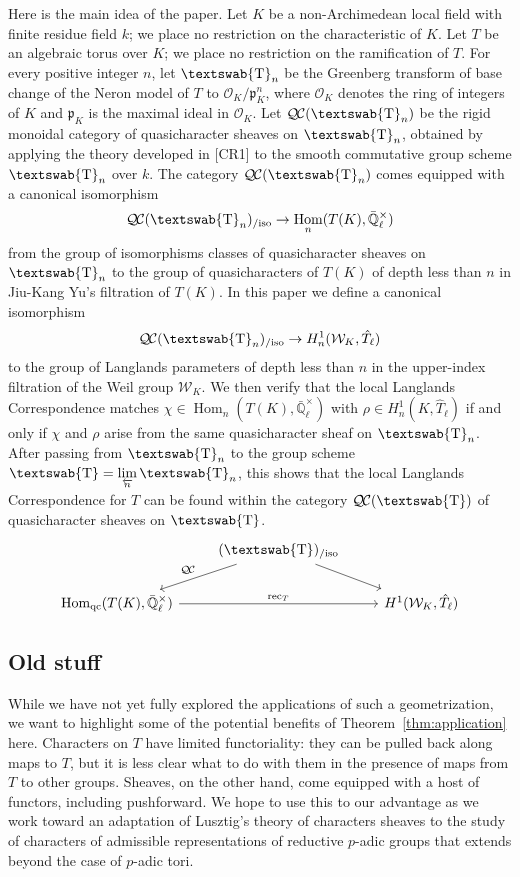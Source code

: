 \documentclass{amsart}
\theoremstyle{plain}
\theoremstyle{definition}
\theoremstyle{remark}
\newcommand{\EE}{\mathbb{\bar Q}_\ell}
\newcommand{\OK}{\mathcal{O}_K}
\newcommand{\pK}{\mathfrak{p}_K}
\newcommand{\Fq}{k}
\newcommand{\EEx}{\EE^\times}
\newcommand{\Weil}[1]{\mathcal{W}_{#1}}
\newcommand{\mathswab}[1]{\operatorname{\textswab{#1}}}
\newcommand{\GN}[1]{\mathswab{#1}}
\DeclareMathOperator{\Hom}{Hom}
\newcommand{\invlim}[1]{\lim\limits_{\overleftarrow{#1}}}
\newcommand{\QC}{{\mathcal{Q\hskip-0.8pt C}}}
\newcommand{\QCiso}[1]{\QC(#1)_{/\text{iso}}}
\begin{document}
Here is the main idea of the paper.
Let $K$ be a non-Archimedean local field with finite residue field $\Fq$; we place no restriction on the characteristic of $K$.
Let $T$ be an algebraic torus over $K$; we place no restriction on the ramification of $T$.
For every positive integer $n$, let $\GN{T}_n$ be the Greenberg transform of base change of the Neron model of $T$ to $\OK/\pK^n$,
where $\OK$ denotes the ring of integers of $K$ and $\pK$ is the maximal ideal in $\OK$.
Let $\QC(\GN{T}_n)$ be the rigid monoidal category of quasicharacter sheaves on $\GN{T}_n$,
obtained by applying the theory developed in [CR1] to the smooth commutative group scheme $\GN{T}_n$ over $\Fq$.
The category $\QC(\GN{T}_n)$ comes equipped with a canonical isomorphism
\[
\QCiso{\GN{T}_n} \to \Hom_{n}(T(K),\EEx)
\]
from the group of isomorphisms classes of quasicharacter sheaves on $\GN{T}_n$ to the group of quasicharacters of $T(K)$ of depth less than $n$ in Jiu-Kang Yu's filtration of $T(K)$.
In this paper we define a canonical isomorphism
\[
\QCiso{\GN{T}_n} \to H^1_{n}(\Weil{K},\hat{T}_\ell)
\]
to the group of Langlands parameters of depth less than $n$ in the upper-index filtration of the Weil group $\Weil{K}$.
We then verify that the local Langlands Correspondence matches $\chi \in \Hom_{n}(T(K),\EEx)$ with $\rho \in H^1_{n}(K,\hat{T}_\ell)$ if and only if $\chi$ and $\rho$ arise from the same quasicharacter sheaf on $\GN{T}_n$.
After passing from $\GN{T}_n$ to the group scheme $\GN{T} = \invlim{n} \GN{T}_n$, this shows that the local Langlands Correspondence for $T$ can be found within the category $\QC(\GN{T})$ of quasicharacter sheaves on $\GN{T}$.
\[
\begin{tikzcd}
\ & \arrow[swap]{dl}{} \QCiso{\GN{T}} \arrow{dr}{} & \\
\Hom_\text{qc}(T(K),\EEx) \arrow{rr}{\text{rec}_T} && H^1(\Weil{K},\hat{T}_\ell)
\end{tikzcd}
\]

\subsection*{Old stuff}
While we have not yet fully explored the applications of such a geometrization, we want to highlight
some of the potential benefits of Theorem~\ref{thm:application} here.
Characters on $T$ have limited
functoriality: they can be pulled back along maps to $T$, but it is less clear what to do with them
in the presence of maps from $T$ to other groups.  Sheaves, on the other hand, come
equipped with a host of functors, including pushforward.
We hope to use this to our advantage as we work toward an adaptation of
Lusztig's theory of characters sheaves to the study of characters of
admissible representations of reductive $p$-adic groups that extends beyond the case of $p$-adic tori.
\end{document}
